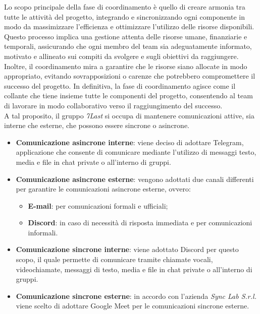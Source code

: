 Lo scopo principale della fase di coordinamento è quello di creare armonia tra tutte le attività del progetto, integrando e sincronizzando ogni componente in modo da massimizzare l'efficienza e ottimizzare l'utilizzo delle risorse disponibili. Questo processo implica una gestione attenta delle risorse umane, finanziarie e temporali, assicurando che ogni membro del team sia adeguatamente informato, motivato e allineato sui compiti da svolgere e sugli obiettivi da raggiungere. Inoltre, il coordinamento mira a garantire che le risorse siano allocate in modo appropriato, evitando sovrapposizioni o carenze che potrebbero compromettere il successo del progetto. In definitiva, la fase di coordinamento agisce come il collante che tiene insieme tutte le componenti del progetto, consentendo al team di lavorare in modo collaborativo verso il raggiungimento del successo.\\
A tal proposito, il gruppo \textit{7Last} si occupa di mantenere comunicazioni attive, sia interne che esterne, che possono essere sincrone o asincrone.
\begin{itemize}
    \item \textbf{Comunicazione asincrone interne}: viene deciso di adottare Telegram, applicazione che consente di comunicare mediante l'utilizzo di messaggi testo, media e file in chat private o all'interno di gruppi.
    \item \textbf{Comunicazione asincrone esterne}: vengono adottati due canali differenti per garantire le comunicazioni asincrone esterne, ovvero: 
        \begin{itemize}
            \item \textbf{E-mail}: per comunicazioni formali e ufficiali;
            \item \textbf{Discord}: in caso di necessità di risposta immediata e per comunicazioni informali.
        \end{itemize}
\end{itemize}
\begin{itemize}
    \item \textbf{Comunicazione sincrone interne}: viene adottato Discord per questo scopo, il quale permette di comunicare tramite chiamate vocali, videochiamate, messaggi di testo, media e file in chat private o all'interno di gruppi.
    \item \textbf{Comunicazione sincrone esterne}: in accordo con l'azienda \textit{Sync Lab S.r.l.} viene scelto di adottare Google Meet per le comunicazioni sincrone esterne.
\end{itemize}

